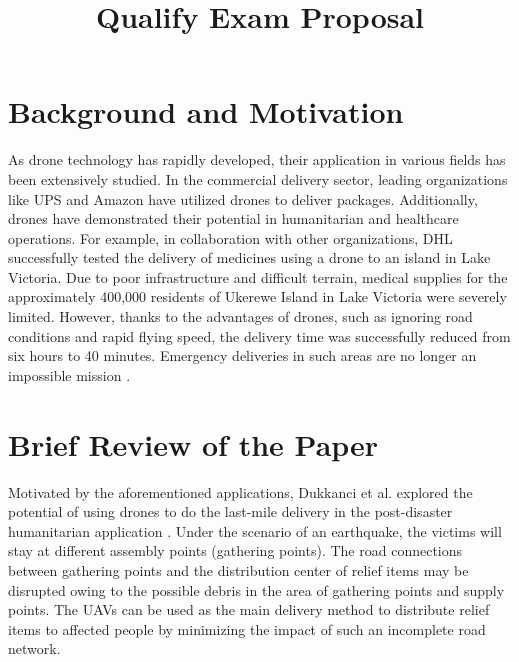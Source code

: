 \documentclass{lxaiproposal}
\title{Qualify Exam Proposal}
\author{\coord{Yuyang}{Ma}{}}
\begin{document}
\maketitle
\section{Background and Motivation}
\vspace*{-3mm}


As drone technology has rapidly developed, their application in various fields has been extensively studied. In the commercial delivery sector, leading organizations like UPS \cite{ups2017drone} and Amazon \cite{amazon2022drone} have utilized drones to deliver packages. Additionally, drones have demonstrated their potential in humanitarian and healthcare operations. For example, in collaboration with other organizations, DHL successfully tested the delivery of medicines using a drone to an island in Lake Victoria. Due to poor infrastructure and difficult terrain, medical supplies for the approximately 400,000 residents of Ukerewe Island in Lake Victoria were severely limited. However, thanks to the advantages of drones, such as ignoring road conditions and rapid flying speed, the delivery time was successfully reduced from six hours to 40 minutes. Emergency deliveries in such areas are no longer an impossible mission \cite{dhl2018drone}.


\section{Brief Review of the Paper \cite{dukkanci2023drones}}
\vspace*{-3mm}


Motivated by the aforementioned applications, Dukkanci et al. explored the potential of using drones to do the last-mile delivery in the post-disaster humanitarian application \cite{dukkanci2023drones}. Under the scenario of an earthquake, the victims will stay at different assembly points (gathering points). The road connections between gathering points and the distribution center of relief items may be disrupted owing to the possible debris in the area of gathering points and supply points. The UAVs can be used as the main delivery method to distribute relief items to affected people by minimizing the impact of such an incomplete road network.
\end{document}
